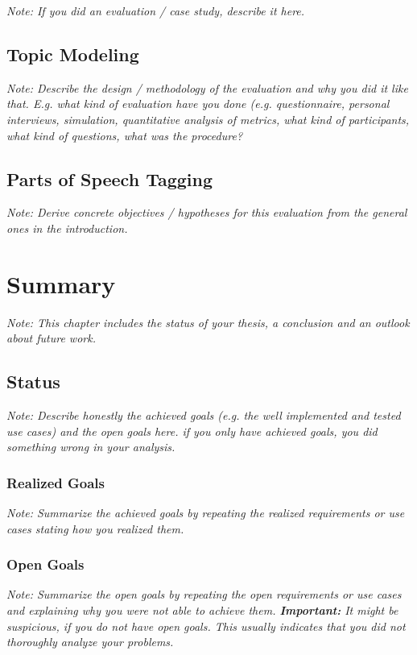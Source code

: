 \documentclass[a4paper,12pt,twoside]{report}
\begin{document}
\textit{Note: If you did an evaluation / case study, describe it here.}

\section{Topic Modeling}

\textit{Note: Describe the design / methodology of the evaluation and why you did it like that. E.g. what kind of evaluation have you done (e.g. questionnaire, personal interviews, simulation, quantitative analysis of metrics, what kind of participants, what kind of questions, what was the procedure?}

\section{Parts of Speech Tagging}

\textit{Note: Derive concrete objectives / hypotheses for this evaluation from the general ones in the introduction.}


\chapter{Summary}

\textit{Note: This chapter includes the status of your thesis, a conclusion and an outlook about future work.}

\section{Status}

\textit{Note: Describe honestly the achieved goals (e.g. the well implemented and tested use cases) and the open goals here. if you only have achieved goals, you did something wrong in your analysis.}

\subsection{Realized Goals}

\textit{Note: Summarize the achieved goals by repeating the realized requirements or use cases stating how you realized them.}

\subsection{Open Goals}

\textit{Note: Summarize the open goals by repeating the open requirements or use cases and explaining why you were not able to achieve them. \textbf{Important:} It might be suspicious, if you do not have open goals. This usually indicates that you did not thoroughly analyze your problems.}
\end{document}
